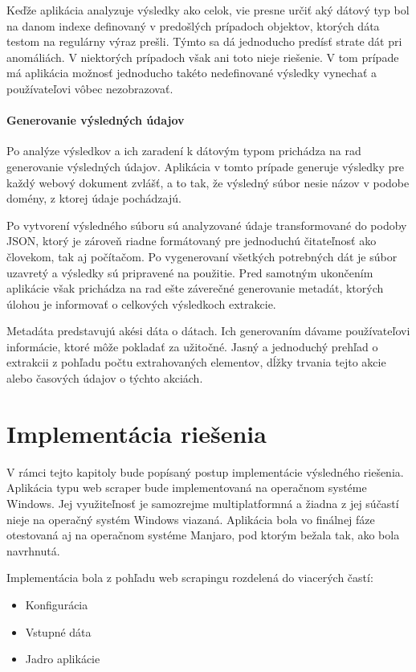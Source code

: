Keďže aplikácia analyzuje výsledky ako celok, vie presne určiť aký dátový typ bol na danom indexe definovaný v predošlých prípadoch objektov, ktorých dáta testom na regulárny výraz prešli. Týmto sa dá jednoducho predísť strate dát pri anomáliách. V niektorých prípadoch však ani toto nieje riešenie. V tom prípade má aplikácia možnosť jednoducho takéto nedefinované výsledky vynechať a používateľovi vôbec nezobrazovať.

\subsubsection{Generovanie výsledných údajov}

Po analýze výsledkov a ich zaradení k dátovým typom prichádza na rad generovanie výsledných údajov. Aplikácia v tomto prípade generuje výsledky pre každý webový dokument zvlášť, a to tak, že výsledný súbor nesie názov v podobe domény, z ktorej údaje pochádzajú.

Po vytvorení výsledného súboru sú analyzované údaje transformované do podoby JSON, ktorý je zároveň riadne formátovaný pre jednoduchú čitateľnosť ako človekom, tak aj počítačom. Po vygenerovaní všetkých potrebných dát je súbor uzavretý a výsledky sú pripravené na použitie. Pred samotným ukončením aplikácie však prichádza na rad ešte záverečné generovanie metadát, ktorých úlohou je informovať o celkových výsledkoch extrakcie.

Metadáta predstavujú akési dáta o dátach. Ich generovaním dávame používateľovi informácie, ktoré môže pokladať za užitočné. Jasný a jednoduchý prehľad o extrakcii z pohľadu počtu extrahovaných elementov, dĺžky trvania tejto akcie alebo časových údajov o týchto akciách.

\chapter{Implementácia riešenia}
\label{implementacia}

V rámci tejto kapitoly bude popísaný postup implementácie výsledného riešenia. Aplikácia typu web scraper bude implementovaná na operačnom systéme Windows. Jej využiteľnosť je samozrejme multiplatformná a žiadna z jej súčastí nieje na operačný systém Windows viazaná. Aplikácia bola vo finálnej fáze otestovaná aj na operačnom systéme Manjaro, pod ktorým bežala tak, ako bola navrhnutá.

Implementácia bola z pohľadu web scrapingu rozdelená do viacerých častí:

\begin{itemize}
    \item {Konfigurácia}
    \item {Vstupné dáta}
    \item {Jadro aplikácie}
\end{itemize}

